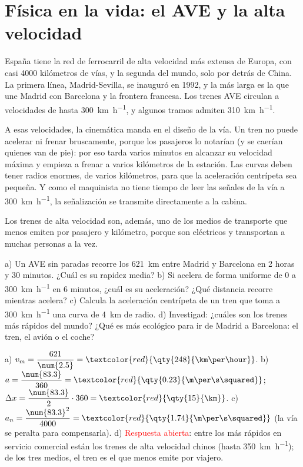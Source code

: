 \section{Física en la vida: el AVE y la alta velocidad}\label{sec:ud9-ave}

España tiene la red de ferrocarril de alta velocidad más extensa de Europa, con casi \num{4000} kilómetros de vías, y la segunda del
mundo, solo por detrás de China. La primera línea, Madrid-Sevilla, se inauguró en 1992, y la más larga es la que une Madrid con
Barcelona y la frontera francesa. Los trenes AVE circulan a velocidades de hasta \qty{300}{\km\per\hour}, y algunos tramos admiten
\qty{310}{\km\per\hour}.

A esas velocidades, la cinemática manda en el diseño de la vía. Un tren no puede acelerar ni frenar bruscamente, porque los
pasajeros lo notarían (y se caerían quienes van de pie): por eso tarda varios minutos en alcanzar su velocidad máxima y empieza a
frenar a varios kilómetros de la estación. Las curvas deben tener radios enormes, de varios kilómetros, para que la aceleración
centrípeta sea pequeña. Y como el maquinista no tiene tiempo de leer las señales de la vía a \qty{300}{\km\per\hour}, la señalización
se transmite directamente a la cabina.

Los trenes de alta velocidad son, además, uno de los medios de transporte que menos  emiten por pasajero y kilómetro, porque
son eléctricos y transportan a muchas personas a la vez.

\begin{exercise}
    a) Un AVE sin paradas recorre los \qty{621}{\km} entre Madrid y Barcelona en 2 horas y 30 minutos. ¿Cuál es su rapidez media?
    b) Si acelera de forma uniforme de 0 a \qty{300}{\km\per\hour} en 6 minutos, ¿cuál es su aceleración? ¿Qué distancia recorre
    mientras acelera? c) Calcula la aceleración centrípeta de un tren que toma a \qty{300}{\km\per\hour} una curva de \qty{4}{\km} de
    radio. d) Investigad: ¿cuáles son los trenes más rápidos del mundo? ¿Qué es más ecológico para ir de Madrid a Barcelona: el
    tren, el avión o el coche?
    \begin{solu}
        a) \(v_m = \dfrac{621}{\num{2.5}} = \textcolor{red}{\qty{248}{\km\per\hour}}\). b) \(a = \dfrac{\num{83.3}}{360} =
        \textcolor{red}{\qty{0.23}{\m\per\s\squared}}\); \(\Delta x = \dfrac{\num{83.3}}{2} \cdot 360 = \textcolor{red}{\qty{15}{\km}}\).
        c) \(a_n = \dfrac{\num{83.3}^2}{4000} = \textcolor{red}{\qty{1.74}{\m\per\s\squared}}\) (la vía se peralta para compensarla).
        d) \textcolor{red}{Respuesta abierta}: entre los más rápidos en servicio comercial están los trenes de alta velocidad
        chinos (hasta \qty{350}{\km\per\hour}); de los tres medios, el tren es el que menos  emite por viajero.
    \end{solu}
\end{exercise}


